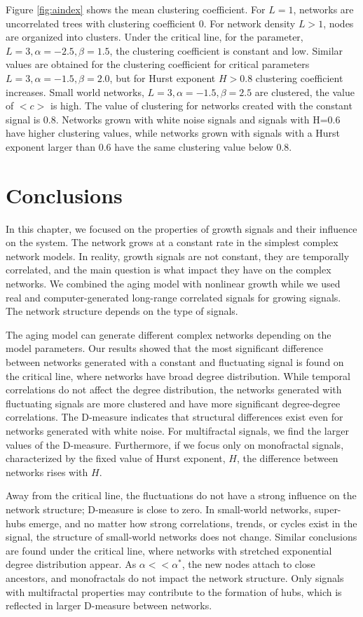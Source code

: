 Figure \ref{fig:aindex} shows the mean clustering coefficient. For $L=1$, networks are uncorrelated trees with clustering coefficient $0$. For network density $L>1$, nodes are organized into clusters. Under the critical line, for the parameter, $L=3, \alpha=-2.5, \beta=1.5 $, the clustering coefficient is constant and low. Similar values are obtained for the clustering coefficient for critical parameters $L=3, \alpha=-1.5, \beta=2.0$, but for Hurst exponent $H>0.8$ clustering coefficient increases. Small world networks,  $L=3, \alpha=-1.5, \beta=2.5$ are clustered, the value of $<c>$ is high.  The value of clustering for networks created with the constant signal is 0.8. Networks grown with white noise signals and signals with H=0.6 have higher clustering values, while networks grown with signals with a Hurst exponent larger than 0.6 have the same clustering value below 0.8. 

\section{Conclusions}

In this chapter, we focused on the properties of growth signals and their influence on the system. The network grows at a constant rate in the simplest complex network models. In reality, growth signals are not constant, they are temporally correlated, and the main question is what impact they have on the complex networks. We combined the aging model with nonlinear growth while we used real and computer-generated long-range correlated signals for growing signals. The network structure depends on the type of signals.

The aging model can generate different complex networks depending on the model parameters. Our results showed that the most significant difference between networks generated with a constant and fluctuating signal is found on the critical line, where networks have broad degree distribution. While temporal correlations do not affect the degree distribution, the networks generated with fluctuating signals are more clustered and have more significant degree-degree correlations. The D-measure indicates that structural differences exist even for networks generated with white noise. For multifractal signals, we find the larger values of the D-measure. Furthermore, if we focus only on monofractal signals, characterized by the fixed value of Hurst exponent, $H$, the difference between networks rises with $H$. 

Away from the critical line, the fluctuations do not have a strong influence on the network structure; D-measure is close to zero. In small-world networks, super-hubs emerge, and no matter how strong correlations, trends, or cycles exist in the signal, the structure of small-world networks does not change. Similar conclusions are found under the critical line, where networks with stretched exponential degree distribution appear. As $\alpha<<\alpha^{*}$, the new nodes attach to close ancestors, and monofractals do not impact the network structure. Only signals with multifractal properties may contribute to the formation of hubs, which is reflected in larger D-measure between networks. 

